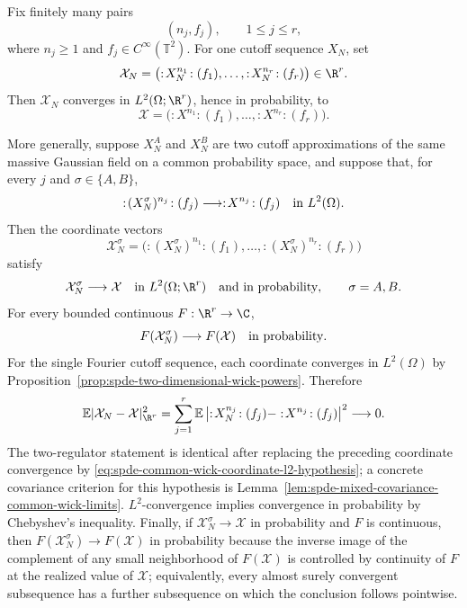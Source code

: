 \begin{remark}
\label{rem:spde-common-wick-coordinate-limits}
Fix finitely many pairs
\[
  (n_j,f_j),\qquad 1\leq j\leq r,
\]
where \(n_j\geq1\) and \(f_j\in C^\infty(\mathbb T^2)\).  For one cutoff
sequence \(X_N\), set
\[
  \mathcal X_N
  =
  \bigl(:\!X_N^{n_1}\!:(f_1),\ldots,
        :\!X_N^{n_r}\!:(f_r)\bigr)\in\R^r .
\]
Then \(\mathcal X_N\) converges in \(L^2(\Omega;\R^r)\), hence in
probability, to
\[
  \mathcal X
  =
  \bigl(:\!X^{n_1}\!:(f_1),\ldots,
        :\!X^{n_r}\!:(f_r)\bigr).
\]

More generally, suppose \(X_N^A\) and \(X_N^B\) are two cutoff
approximations of the same massive Gaussian field on a common probability
space, and suppose that, for every \(j\) and
\(\sigma\in\{A,B\}\),
\begin{equation}
  :\!(X_N^\sigma)^{n_j}\!:(f_j)
  \longrightarrow
  :\!X^{n_j}\!:(f_j)
  \quad\hbox{in }L^2(\Omega).
  \label{eq:spde-common-wick-coordinate-l2-hypothesis}
\end{equation}
Then the coordinate vectors
\[
  \mathcal X_N^\sigma
  =
  \bigl(:\!(X_N^\sigma)^{n_1}\!:(f_1),\ldots,
        :\!(X_N^\sigma)^{n_r}\!:(f_r)\bigr)
\]
satisfy
\begin{equation}
  \mathcal X_N^\sigma\longrightarrow\mathcal X
  \quad\hbox{in }L^2(\Omega;\R^r)
  \quad\hbox{and in probability},
  \qquad \sigma=A,B .
  \label{eq:spde-common-wick-coordinate-vector-convergence}
\end{equation}
For every bounded continuous \(F:\R^r\to\C\),
\begin{equation}
  F(\mathcal X_N^\sigma)\longrightarrow F(\mathcal X)
  \quad\hbox{in probability}.
  \label{eq:spde-common-wick-coordinate-observable-convergence}
\end{equation}
For the single Fourier cutoff sequence, each coordinate converges in
\(L^2(\Omega)\) by
Proposition~\ref{prop:spde-two-dimensional-wick-powers}.  Therefore
\[
  \mathbb E|\mathcal X_N-\mathcal X|_{\R^r}^2
  =
  \sum_{j=1}^r
  \mathbb E
  \left|
    :\!X_N^{n_j}\!:(f_j)-:\!X^{n_j}\!:(f_j)
  \right|^2
  \longrightarrow0 .
\]
The two-regulator statement is identical after replacing the preceding
coordinate convergence by
\eqref{eq:spde-common-wick-coordinate-l2-hypothesis}; a concrete covariance
criterion for this hypothesis is
Lemma~\ref{lem:spde-mixed-covariance-common-wick-limits}.
\(L^2\)-convergence
implies convergence in probability by Chebyshev's inequality.  Finally,
if \(\mathcal X_N^\sigma\to\mathcal X\) in probability and \(F\) is
continuous, then \(F(\mathcal X_N^\sigma)\to F(\mathcal X)\) in probability
because the inverse image of the complement of any small neighborhood of
\(F(\mathcal X)\) is controlled by continuity of \(F\) at the realized value
of \(\mathcal X\); equivalently, every almost surely convergent subsequence
has a further subsequence on which the conclusion follows pointwise.
\end{remark}

